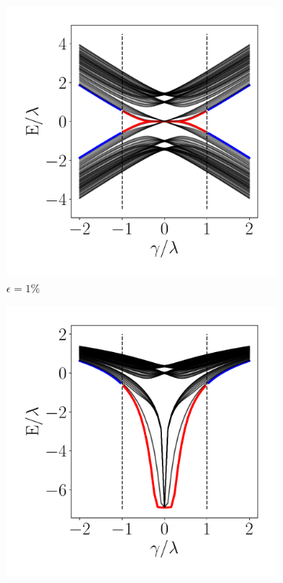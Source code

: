 \begin{figure}[tbh!]
     \centering
    \captionsetup[sub]{font=small}
     \begin{minipage}[h!]{0.9\textwidth}
         \begin{subfigure}[b!]{0.3 \textwidth}
            \caption{$\epsilon = 1\%$}             \includegraphics[width=\textwidth]{Imagenes/Resultados_Hoti_Fractal/bands_square_shh_0.05.pdf}
         \end{subfigure}\hspace*{-0.5em}
         \begin{subfigure}[b!]{0.3 \textwidth}
             \caption*{}
             \includegraphics[width=\textwidth]{Imagenes/Resultados_Hoti_Fractal/bands_square_shh_log0.05.pdf}

\end{subfigure}
\end{minipage}
\end{figure}
